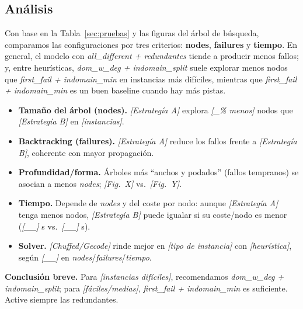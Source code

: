 
\subsection{Análisis}\label{sec:analisis}

Con base en la Tabla~\ref{sec:pruebas} y las figuras del árbol de búsqueda, comparamos las configuraciones por tres criterios: \textbf{nodes}, \textbf{failures} y \textbf{tiempo}. En general, el modelo con \textit{all\_different + redundantes} tiende a producir menos fallos; y, entre heurísticas, \textit{dom\_w\_deg + indomain\_split} suele explorar menos nodos que \textit{first\_fail + indomain\_min} en instancias más difíciles, mientras que \textit{first\_fail + indomain\_min} es un buen baseline cuando hay más pistas.

\begin{itemize}
  \item \textbf{Tamaño del árbol (nodes).} \textit{[Estrategía A]} explora \textit{[\_\% menos]} nodos que \textit{[Estrategía B]} en \textit{[instancias]}.
  \item \textbf{Backtracking (failures).} \textit{[Estrategía A]} reduce los fallos frente a \textit{[Estrategía B]}, coherente con mayor propagación.
  \item \textbf{Profundidad/forma.} Árboles más “anchos y podados” (fallos tempranos) se asocian a menos \textit{nodes}; \textit{[Fig.~X]} vs.\ \textit{[Fig.~Y]}.
  \item \textbf{Tiempo.} Depende de \textit{nodes} y del coste por nodo: aunque \textit{[Estrategía A]} tenga menos nodos, \textit{[Estrategía B]} puede igualar si su coste/nodo es menor (\textit{[\_\_]} s vs.\ \textit{[\_\_]} s).
  \item \textbf{Solver.} \textit{[Chuffed/Gecode]} rinde mejor en \textit{[tipo de instancia]} con \textit{[heurística]}, según \textit{[\_\_]} en \textit{nodes}/\textit{failures}/\textit{tiempo}.
\end{itemize}

\noindent \textbf{Conclusión breve.} Para \textit{[instancias difíciles]}, recomendamos \textit{dom\_w\_deg + indomain\_split}; para \textit{[fáciles/medias]}, \textit{first\_fail + indomain\_min} es suficiente. Active siempre las redundantes.
